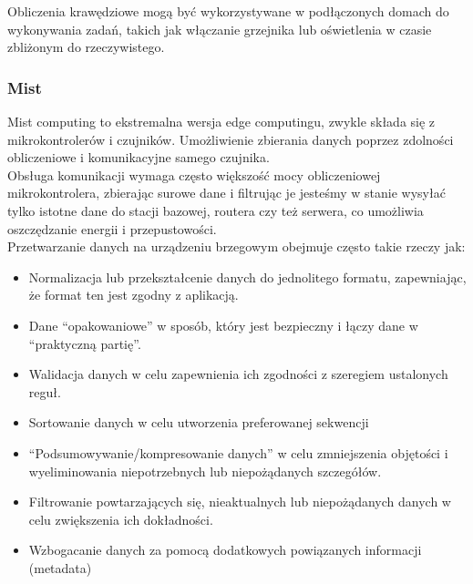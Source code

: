 Obliczenia krawędziowe mogą być wykorzystywane w podłączonych domach do wykonywania zadań, takich jak włączanie grzejnika lub oświetlenia w czasie zbliżonym do rzeczywistego.

\subsubsection{Mist}

Mist computing to ekstremalna wersja edge computingu, zwykle składa się z mikrokontrolerów i czujników. Umożliwienie zbierania danych poprzez zdolności obliczeniowe i komunikacyjne samego czujnika. \\

Obsługa komunikacji wymaga często większość mocy obliczeniowej mikrokontrolera, zbierając surowe dane i filtrując je jesteśmy w stanie wysyłać tylko istotne dane do stacji bazowej, routera czy też serwera, co umożliwia oszczędzanie energii i przepustowości. \\

Przetwarzanie danych na urządzeniu brzegowym obejmuje często takie rzeczy jak:

\begin{itemize}
	\item Normalizacja lub przekształcenie danych do jednolitego formatu, zapewniając, że format ten jest zgodny z aplikacją.
	\item Dane “opakowaniowe” w sposób, który jest bezpieczny i łączy dane w “praktyczną partię”.
	\item Walidacja danych w celu zapewnienia ich zgodności z szeregiem ustalonych reguł.
	\item Sortowanie danych w celu utworzenia preferowanej sekwencji
	\item “Podsumowywanie/kompresowanie danych” w celu zmniejszenia objętości i wyeliminowania niepotrzebnych lub niepożądanych szczegółów.
	\item Filtrowanie powtarzających się, nieaktualnych lub niepożądanych danych w celu zwiększenia ich dokładności.
	\item Wzbogacanie danych za pomocą dodatkowych powiązanych informacji (metadata)
\end{itemize}
